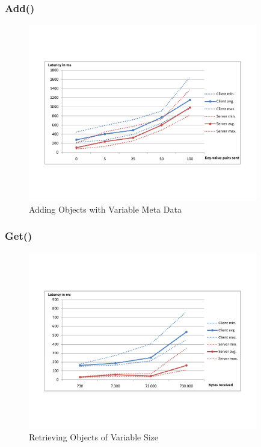 \documentclass{beamer}
\begin{document}
\frame
{
	\frametitle{Add()}
	\begin{figure}[t]
	\begin{center}
	\includegraphics[trim = 0 5cm 0 5cm, width=10cm]{add_md.pdf} 
	\caption{Adding Objects with Variable Meta Data}
	\end{center}
	\end{figure}
}

\frame
{
	\frametitle{Get()}
	\begin{figure}[t]
	\begin{center}
	\includegraphics[trim = 0 5cm 0 5cm, width=10cm]{get_obj.pdf} 
	\caption{Retrieving Objects of Variable Size}
	\end{center}
	\end{figure}
}
\end{document}
